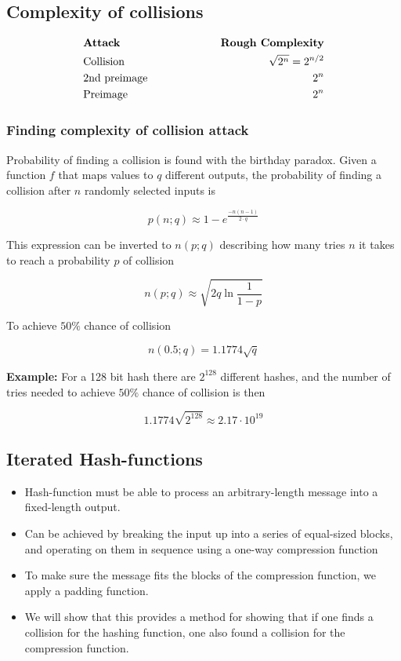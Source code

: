 \subsection{Complexity of collisions}

\begin{align*}
&\mbox{\textbf{Attack}}\hspace{2cm}&\mbox{\textbf{Rough Complexity}}\\
&\mbox{Collision}\hspace{2cm}&\sqrt{2^n}=2^{n/2}\\
&\mbox{2nd preimage}\hspace{2cm}&2^n\\
&\mbox{Preimage}\hspace{2cm}&2^n\\
\end{align*}
\subsubsection*{Finding complexity of collision attack}
Probability of finding a collision is found with the birthday paradox. Given a function $f$ that maps
values to $q$ different outputs, the probability of finding a
collision after $n$ randomly selected inputs is

\[ p(n; q) \approx 1 - e^{\frac{-n(n-1)}{2\cdot q}}\]

This expression can be inverted to $n(p; q)$ describing how many tries
$n$ it takes to reach a probability $p$ of collision

\[ n(p; q) \approx \sqrt{2q \ln \frac{1}{1 - p}} \]

To achieve $50\%$ chance of collision

\[ n(0.5; q) = 1.1774 \sqrt{q} \]

\textbf{Example:} For a 128 bit hash there are $2^{128}$ different
hashes, and the number of tries needed to achieve $50\%$ chance of
collision is then

\[ 1.1774 \sqrt{2^{128}} \approx 2.17 \cdot 10^{19} \]

\subsection{Iterated Hash-functions}
\begin{itemize}
\item Hash-function must be able to process an arbitrary-length
  message into a fixed-length output.
\item Can be achieved by breaking the input up into a series of
  equal-sized blocks, and operating on them in sequence using a
  one-way compression function
\item To make sure the message fits the blocks of the compression
  function, we apply a padding function.
\item We will show that this provides a method for showing that if one
  finds a collision for the hashing function, one also found a
  collision for the compression function.
\end{itemize}

